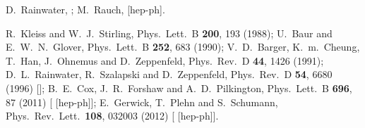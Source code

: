  D.~Rainwater,
  ;
  M.~Rauch,
   [hep-ph].

  R.~Kleiss and W.~J.~Stirling,
  Phys.\ Lett.\ B {\bf 200}, 193 (1988);
  U.~Baur and E.~W.~N.~Glover,
  Phys.\ Lett.\ B {\bf 252}, 683 (1990);
  V.~D.~Barger, K.~m.~Cheung, T.~Han, J.~Ohnemus and D.~Zeppenfeld,
  Phys.\ Rev.\ D {\bf 44}, 1426 (1991);
  D.~L.~Rainwater, R.~Szalapski and D.~Zeppenfeld,
  Phys.\ Rev.\ D {\bf 54}, 6680 (1996)
  [];
  B.~E.~Cox, J.~R.~Forshaw and A.~D.~Pilkington,
  Phys.\ Lett.\ B {\bf 696}, 87 (2011)
  [ [hep-ph]];
  E.~Gerwick, T.~Plehn and S.~Schumann,
  Phys.\ Rev.\ Lett.\  {\bf 108}, 032003 (2012)
  [ [hep-ph]].

